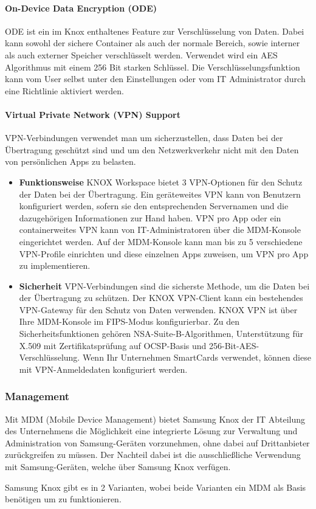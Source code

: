 \paragraph{On-Device Data Encryption (ODE)}
ODE ist ein im Knox enthaltenes Feature zur Verschlüsselung von Daten. Dabei kann sowohl der sichere Container als auch der normale Bereich, sowie interner als auch externer Speicher verschlüsselt werden. Verwendet wird ein AES Algorithmus mit einem 256 Bit starken Schlüssel. Die Verschlüsselungsfunktion kann vom User selbst unter den Einstellungen oder vom IT Administrator durch eine Richtlinie aktiviert werden.
\paragraph{Virtual Private Network (VPN) Support }
VPN-Verbindungen verwendet man um sicherzustellen, dass Daten bei der Übertragung geschützt sind und um den Netzwerkverkehr nicht mit den Daten von persönlichen Apps zu belasten.
\begin{itemize}
	\item \textbf{Funktionsweise} \newline 
	KNOX Workspace bietet 3 VPN-Optionen für den Schutz der Daten bei der Übertragung. Ein geräteweites VPN kann von Benutzern konfiguriert werden, sofern sie den entsprechenden Servernamen und die dazugehörigen Informationen zur Hand haben. VPN pro App oder ein containerweites VPN kann von IT-Administratoren über die MDM-Konsole eingerichtet werden. Auf der MDM-Konsole kann man bis zu 5 verschiedene VPN-Profile einrichten und diese einzelnen Apps zuweisen, um VPN pro App zu implementieren.
	\item \textbf{Sicherheit} \newline 
	VPN-Verbindungen sind die sicherste Methode, um die Daten bei der Übertragung zu schützen. Der KNOX VPN-Client kann ein bestehendes VPN-Gateway für den Schutz von Daten verwenden. KNOX VPN ist über Ihre MDM-Konsole im FIPS-Modus konfigurierbar. Zu den Sicherheitsfunktionen gehören NSA-Suite-B-Algorithmen, Unterstützung für X.509 mit Zertifikatsprüfung auf OCSP-Basis und 256-Bit-AES-Verschlüsselung. Wenn Ihr Unternehmen SmartCards verwendet, können diese mit VPN-Anmeldedaten konfiguriert werden.
\end{itemize}

\subsubsection{Management}
Mit MDM (Mobile Device Management) bietet Samsung Knox der IT Abteilung des Unternehmens die Möglichkeit eine integrierte Lösung zur Verwaltung und Administration von Samsung-Geräten vorzunehmen, ohne dabei auf Drittanbieter zurückgreifen zu müssen. Der Nachteil dabei ist die ausschließliche Verwendung mit Samsung-Geräten, welche über Samsung Knox verfügen.
\par
Samsung Knox gibt es in 2 Varianten, wobei beide Varianten ein MDM als Basis benötigen um zu funktionieren.
